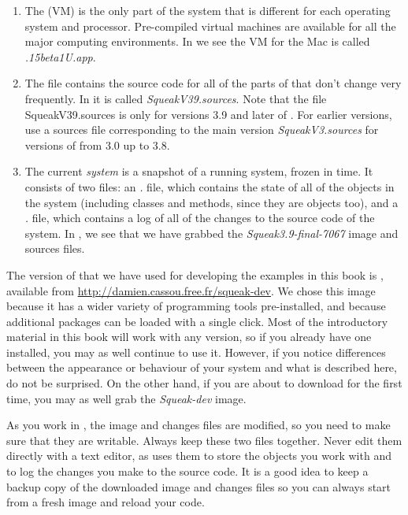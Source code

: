 \documentclass[a4paper,10pt,twoside]{book}
\begin{document}
\begin{enumerate}

  \item The  (VM) is the only part of the system that is different for each operating system and processor.  Pre-compiled virtual machines are available for all the major computing environments.  In  we see the VM for the Mac is called \textit{.15beta1U.app}.

  \item The  file contains the source code for all of the parts of \sq that don't change very frequently. In  it is called \emph{SqueakV39.sources}. Note that the file SqueakV39.sources is only for versions 3.9 and later of \sq. For earlier versions, use a sources file corresponding to the main version \eg \textit{SqueakV3.sources} for versions of \sq from 3.0 up to 3.8.

  \item The current \emph{system } is a snapshot of a running \sq system, frozen in time.  It consists of two files: an \emph{.} file, which contains the state of all of the objects in the system (including classes and methods, since they are objects too), and a \emph{.} file, which contains a log of all of the changes to the source code of the system.
In , we see that we have grabbed the \textit{Squeak3.9-final-7067} image and sources files.
\end{enumerate}


The version of \sq that we have used for developing the examples in this book is , available from \url{http://damien.cassou.free.fr/squeak-dev}.
\label{sec:squeakDev}
We chose this image because it has a wider variety of programming tools pre-installed, and because additional packages can be loaded with a single click.  
Most of the introductory material in this book will work with any version, so if you already have one installed, you may as well continue to use it.  
However, if you notice differences between the appearance or behaviour of your system and what is described here, do not be surprised. 
On the other hand, if you are about to download \sq for the first time, you may as well grab the \emph{Squeak-dev} image.

As you work in \sq, the image and changes files are modified, so you need to make sure that they are writable.
Always keep these two files together.
Never edit them directly with a text editor, as \sq uses them to store the objects you work with and to log the changes you make to the source code.
It is a good idea to keep a backup copy of the downloaded image and changes files so you can always start from a fresh image and reload your code.
\end{document}
